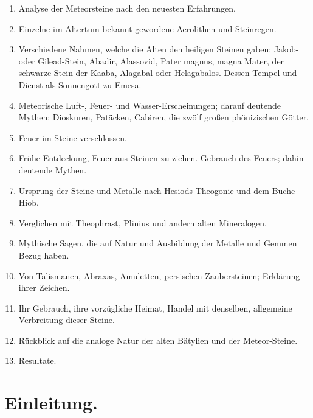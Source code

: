 \documentclass[a4paper, 11pt, oneside, polutonikogreek, german]{article}
\begin{document}
\begin{enumerate}
\begin{enumerate}
        \item Analyse der Meteorsteine nach den neuesten Erfahrungen.
        \item Einzelne im Altertum bekannt gewordene Aerolithen und Steinregen.
        \item Verschiedene Nahmen, welche die Alten den heiligen Steinen gaben: Jakob- oder Gilead-Stein, Abadir, Alassovid, Pater magnus, magna Mater, der schwarze Stein der Kaaba, Alagabal oder Helagabalos. Dessen Tempel und Dienst als Sonnengott zu Emesa.
        \item Meteorische Luft-, Feuer- und Wasser-Erscheinungen; darauf deutende Mythen: Dioskuren, Patäcken, Cabiren, die zwölf großen phönizischen Götter.
        \item Feuer im Steine verschlossen.
        \item Frühe Entdeckung, Feuer aus Steinen zu ziehen. Gebrauch des Feuers; dahin deutende Mythen.
        \item Ursprung der Steine und Metalle nach Hesiods Theogonie und dem Buche Hiob.
        \item Verglichen mit Theophrast, Plinius und andern alten Mineralogen.
        \item Mythische Sagen, die auf Natur und Ausbildung der Metalle und Gemmen Bezug haben.
        \item Von Talismanen, Abraxas, Amuletten, persischen Zaubersteinen; Erklärung ihrer Zeichen.
        \item Ihr Gebrauch, ihre vorzügliche Heimat, Handel mit denselben, allgemeine Verbreitung dieser Steine.
        \item Rückblick auf die analoge Natur der alten Bätylien und der Meteor-Steine.
        \item Resultate.
    \end{enumerate}
\end{enumerate}
\clearpage
\section*{Einleitung.}
\end{document}
